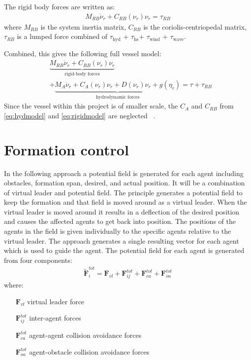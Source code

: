 \documentclass[a4paper,conference]{IEEEtran}
\begin{document}
The rigid body forces are written as:
\begin{align}
M_{RB} \dot \nu_r + C_{RB}(\nu_r)\nu_r = \tau_{RB}
\label{eq:rigidmodel}
\end{align}
where $M_{RB}$ is the system inertia matrix, $C_{RB}$ is the coriolis-centriopedal matrix, $\tau_{RB}$ is a lumped force combined of $\tau_{\text{hyd}}$ + $\tau_{\text{hs}}$+ $\tau_{\text{wind}}$ + $\tau_{\text{wave}}$.

Combined, this gives the following full vessel model:
\begin{align}
&\underbrace{M_{RB} \dot \nu_r + C_{RB}(\nu_r)\nu_r}_{\text{rigid-body forces}}\\\nonumber
&+ \underbrace{M_A \dot \nu_r + C_A(\nu_r)\nu_r + D(\nu_r)\nu_r + g(\eta_r)}_{\text{hydrodynamic forces}}  = \tau + \tau_{RB}
\label{eq:totmodel}
\end{align}
Since the vessel within this project is of smaller scale, the $C_A$ and $C_{RB}$ from \ref{eq:hydmodel} and \ref{eq:rigidmodel} are neglected ~\citep[eq. (2.23)]{fullactuatship}.



\section{Formation control}
\label{sc:one-approach}
In the following approach a potential field is generated for each
agent including obstacles, formation span, desired, and actual
position.  It will be a combination of virtual leader and potential
field. The principle generates a potential field to keep the formation
and that field is moved around as a virtual leader. When the virtual
leader is moved around it results in a deflection of the desired
position and causes the affected agents to get back into position. The
positions of the agents in the field is given individually to the
specific agents relative to the virtual leader. The approach generates
a single resulting vector for each agent which is used to guide the
agent. The potential field for each agent is generated from four
components:
\begin{align}
\tilde{\mathbf{F}}_i^{tot} = \mathbf{F}_{vl}+\mathbf{F}_{ij}^{tot}+\mathbf{F}_{ca}^{tot}+\mathbf{F}_{oa}^{tot}
\end{align}
where:
\begin{itemize}
\item[$\mathbf{F}_{vl}$] virtual leader force
\item[$\mathbf{F}_{ij}^{tot}$] inter-agent forces
\item[$\mathbf{F}_{ca}^{tot}$] agent-agent collision avoidance forces
\item[$\mathbf{F}_{oa}^{tot}$] agent-obstacle collision avoidance forces
\end{itemize}
\end{document}
